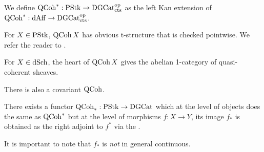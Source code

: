 \documentclass[./main.tex]{subfiles}
\begin{document}
\begin{dfn}
  
  We define $\mathrm{QCoh}^* : \mathrm{PStk} \to \mathrm{DGCat}_{\mathrm{cts}}^{\mathrm{op}}$
  as the left Kan extension of $\mathrm{QCoh}^* : \mathrm{dAff} \to \mathrm{DGCat}_{\mathrm{cts}}^{\mathrm{op}}$.
\end{dfn}

\begin{rmk}
  For $X \in \mathrm{PStk}$, $\mathrm{QCoh}\,X$ has obvious t-structure
  that is checked pointwise. 
  We refer the reader to \cite[Ch 3, 1.5]{GR1}.

  For $X \in \mathrm{dSch}$, 
  the heart of $\mathrm{QCoh}\,X$ gives the abelian 1-category
  of quasi-coherent sheaves.
\end{rmk}

There is also a covariant $\mathrm{QCoh}$.

\begin{prop}

  There exists a functor $\mathrm{QCoh}_* : \mathrm{PStk} \to \mathrm{DGCat}$
  which at the level of objects does the same as $\mathrm{QCoh}^*$
  but at the level of morphisms $f : X \to Y$,
  its image $f_*$ is obtained as the right adjoint to
  $f^*$ via the .
  \cite[Ch 3, 2.1.1]{GR1}
\end{prop}

\begin{rmk}
  It is important to note that $f_*$ is \emph{not} in general
  continuous.
\end{rmk}
\end{document}
